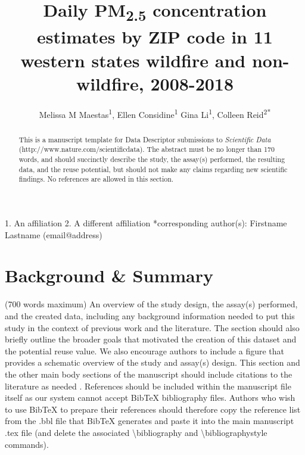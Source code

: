\documentclass[english]{article}
\begin{document}
\title{Daily PM\textsubscript{2.5} concentration estimates by ZIP code in 11 western states wildfire and non-wildfire, 2008-2018} %

\author{Melissa M Maestas\textsuperscript{1}, 
Ellen Considine\textsuperscript{1}
Gina Li\textsuperscript{1}, 
Colleen Reid\textsuperscript{2{*}}}

\maketitle
\thispagestyle{fancy}

1. An affiliation 2. A different affiliation {*}corresponding author(s):
Firstname Lastname (email@address)
\begin{abstract}
This is a manuscript template for Data Descriptor submissions to \emph{Scientific
Data} (http://www.nature.com/scientificdata). The abstract must be
no longer than 170 words, and should succinctly describe the study,
the assay(s) performed, the resulting data, and the reuse potential,
but should not make any claims regarding new scientific findings.
No references are allowed in this section. 
\end{abstract}

\section*{Background \& Summary}

(700 words maximum) An overview of the study design, the assay(s)
performed, and the created data, including any background information
needed to put this study in the context of previous work and the literature.
The section should also briefly outline the broader goals that motivated
the creation of this dataset and the potential reuse value. We also
encourage authors to include a figure that provides a schematic overview
of the study and assay(s) design. This section and the other main
body sections of the manuscript should include citations to the literature
as needed \cite{cite1, cite2}. References should be included within the 
manuscript file itself as our system cannot accept BibTeX bibliography files. 
Authors who wish to use BibTeX to prepare their references should therefore 
copy the reference list from the .bbl file that BibTeX generates and paste it 
into the main manuscript .tex file (and delete the associated 
\textbackslash{}bibliography and \textbackslash{}bibliographystyle commands).
\end{document}
